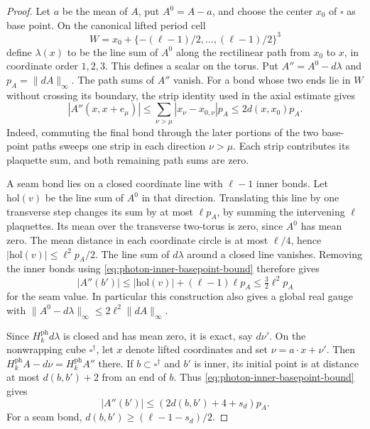 \begin{proof}
Let $a$ be the mean of $A$, put $A^0=A-a$, and choose the center
$x_0$ of $\square$ as base point. On the canonical lifted period
cell
\[
 W=x_0+\{-(\ell-1)/2,\ldots,(\ell-1)/2\}^3
\]
define $\lambda(x)$ to be the line sum of $A^0$ along the
rectilinear path from $x_0$ to $x$, in coordinate order $1,2,3$.
This defines a scalar on the torus. Put $A''=A^0-d\lambda$ and
$p_A=\|dA\|_\infty$. The path sums of $A''$ vanish. For a bond
whose two ends lie in $W$ without crossing its boundary,
the strip identity used in the axial estimate gives
\begin{equation}\label{eq:photon-inner-basepoint-bound}
 |A''(x,x+e_\mu)|\le\sum_{\nu>\mu}|x_\nu-x_{0,\nu}|p_A
                                      \le2d(x,x_0)p_A.
\end{equation}
Indeed, commuting the final bond through the later portions of
the two base-point paths sweeps one strip in each direction
$\nu>\mu$. Each strip contributes its plaquette sum, and both
remaining path sums are zero.

A seam bond lies on a closed coordinate line with $\ell-1$
inner bonds. Let $\mathrm{hol}(v)$ be the line sum of $A^0$ in
that direction. Translating this line by one transverse step
changes its sum by at most $\ell p_A$, by summing the intervening
$\ell$ plaquettes. Its mean over the transverse two-torus is zero,
since $A^0$ has mean zero. The mean distance in each coordinate
circle is at most $\ell/4$, hence
$|\mathrm{hol}(v)|\le\ell^2p_A/2$. The line sum of $d\lambda$
around a closed line vanishes. Removing the inner bonds using
\eqref{eq:photon-inner-basepoint-bound} therefore gives
\begin{equation}\label{eq:photon-seam-basepoint-bound}
 |A''(b')|\le|\mathrm{hol}(v)|+(\ell-1)\ell p_A
                                  \le\tfrac32\ell^2p_A
\end{equation}
for the seam value. In particular this construction also gives a
global real gauge with
$\|A^0-d\lambda\|_\infty\le2\ell^2\|dA\|_\infty$.

Since $H_k^{\mathrm{ph}}d\lambda$ is closed and has mean zero,
it is exact, say $d\nu'$. On the nonwrapping cube
$\square^\dagger$, let $x$ denote lifted coordinates and set
$\nu=a\cdot x+\nu'$. Then
$H_k^{\mathrm{ph}}A-d\nu=H_k^{\mathrm{ph}}A''$ there.
If $b\subset\square^\dagger$ and $b'$ is inner, its initial
point is at distance at most $d(b,b')+2$ from an end of $b$.
Thus \eqref{eq:photon-inner-basepoint-bound} gives
\[
 |A''(b')|\le(2d(b,b')+4+s_d)p_A.
\]
For a seam bond,
$d(b,b')\ge(\ell-1-s_d)/2$.


\end{proof}
